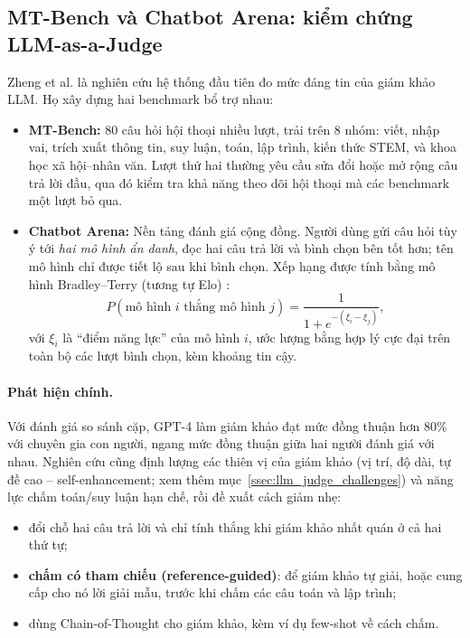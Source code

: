 \subsection{MT-Bench và Chatbot Arena: kiểm chứng LLM-as-a-Judge}
\label{ssec:mtbench_arena}
Zheng et al. \cite{zheng2023judging} là nghiên cứu hệ thống đầu tiên đo mức đáng tin của giám khảo LLM. Họ xây dựng hai benchmark bổ trợ nhau:
\begin{itemize}
	\item \textbf{MT-Bench:} 80 câu hỏi hội thoại nhiều lượt, trải trên 8 nhóm: viết, nhập vai, trích xuất thông tin, suy luận, toán, lập trình, kiến thức STEM, và khoa học xã hội--nhân văn. Lượt thứ hai thường yêu cầu sửa đổi hoặc mở rộng câu trả lời đầu, qua đó kiểm tra khả năng theo dõi hội thoại mà các benchmark một lượt bỏ qua.
	\item \textbf{Chatbot Arena:} Nền tảng đánh giá cộng đồng. Người dùng gửi câu hỏi tùy ý tới \emph{hai mô hình ẩn danh}, đọc hai câu trả lời và bình chọn bên tốt hơn; tên mô hình chỉ được tiết lộ sau khi bình chọn. Xếp hạng được tính bằng mô hình Bradley--Terry (tương tự Elo) \cite{chiang2024arena}:
	\[
	P(\text{mô hình } i \text{ thắng mô hình } j) = \frac{1}{1 + e^{-(\xi_i - \xi_j)}},
	\]
	với $\xi_i$ là “điểm năng lực” của mô hình $i$, ước lượng bằng hợp lý cực đại trên toàn bộ các lượt bình chọn, kèm khoảng tin cậy.
\end{itemize}

\paragraph{Phát hiện chính.} Với đánh giá so sánh cặp, GPT-4 làm giám khảo đạt mức đồng thuận hơn 80\% với chuyên gia con người, ngang mức đồng thuận giữa hai người đánh giá với nhau. Nghiên cứu cũng định lượng các thiên vị của giám khảo (vị trí, độ dài, tự đề cao -- self-enhancement; xem thêm mục~\ref{ssec:llm_judge_challenges}) và năng lực chấm toán/suy luận hạn chế, rồi đề xuất cách giảm nhẹ:
\begin{itemize}
	\item đổi chỗ hai câu trả lời và chỉ tính thắng khi giám khảo nhất quán ở cả hai thứ tự;
	\item \textbf{chấm có tham chiếu (reference-guided)}: để giám khảo tự giải, hoặc cung cấp cho nó lời giải mẫu, trước khi chấm các câu toán và lập trình;
	\item dùng Chain-of-Thought cho giám khảo, kèm ví dụ few-shot về cách chấm.
\end{itemize}

